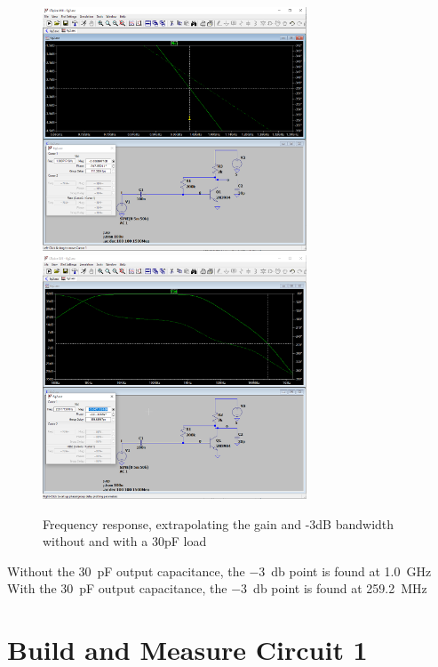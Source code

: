 \documentclass{article}
\begin{document}
	\begin{figure}[H]
	    \centering
	    \includegraphics[width=0.7\textwidth]{2b-1}
	    \includegraphics[width=0.7\textwidth]{2b-2}
	    \caption{Frequency response, extrapolating the gain and -3dB bandwidth without and with a 30pF load}
	\end{figure}
	
	Without the \SI{30}{\pico\farad} output capacitance, the \SI{-3}{\decibel} point is found at \SI{1.0}{\giga\hertz}\\
	With the \SI{30}{\pico\farad} output capacitance, the \SI{-3}{\decibel} point is found at \SI{259.2}{\mega\hertz}	
	
	

	\section{Build and Measure Circuit 1}
	
\end{document}

